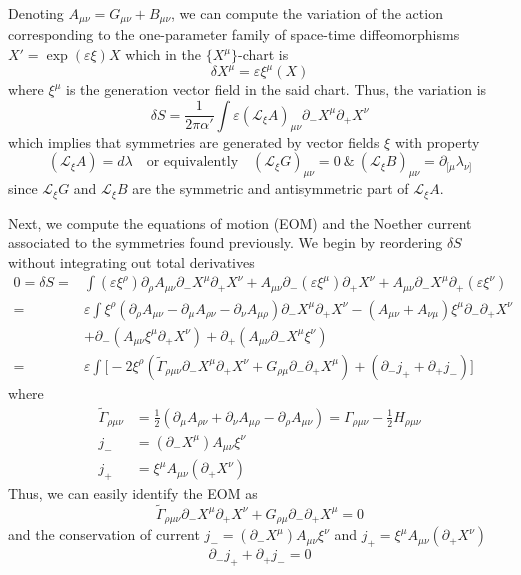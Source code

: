 \documentclass[a4paper,12pt]{article}
\numberwithin{equation}{section}
\numberwithin{thm}{section}
\numberwithin{exm}{section}
\newcommand{\p}{\partial}
\newcommand{\ddm}{\partial_-}
\newcommand{\ddp}{\partial_+}
\newcommand{\lag}{\mathcal L}
\newcommand{\wt}{\widetilde}
\newcommand{\<}{{\langle}}
\renewcommand{\>}{{\rangle}}
\newcommand{\ve}{{\varepsilon}}
\begin{document}
Denoting $A_{\mu\nu}=G_{\mu\nu}+B_{\mu\nu}$, we can compute the variation of the action corresponding to the one-parameter family of space-time diffeomorphisms $X'=\exp(\varepsilon\xi)X$ which in the $\{X^{\mu}\}$-chart is
	\begin{equation}
	\delta X^\mu=\varepsilon\xi^\mu(X)
	\end{equation}
where $\xi^\mu$ is the generation vector field in the said chart. Thus, the variation is
	\begin{equation}
	\delta S=\frac{1}{2\pi\alpha'}\int \varepsilon(\lag_\xi A)_{\mu\nu}\p_-X^\mu\p_+X^\nu
	\end{equation}
which implies that symmetries are generated by vector fields $\xi$ with property
	\begin{equation}
	(\lag_\xi A)=d\lambda\quad\text{or equivalently}\quad(\lag_\xi G)_{\mu\nu}=0\ \&\ (\lag_\xi B)_{\mu\nu}=\p_{[\mu}\lambda_{\nu]}
	\end{equation}
since $\lag_\xi G$ and $\lag_\xi B$ are the symmetric and antisymmetric part of $\lag_\xi A$.

Next, we compute the equations of motion (EOM) and the Noether current associated to the symmetries found previously. We begin by reordering $\delta S$ without integrating out total derivatives
	\begin{align}
	0=\delta S=&\int(\ve\xi^\rho)\p_\rho A_{\mu\nu}\p_-X^\mu\p_+X^\nu + A_{\mu\nu}\p_-(\ve\xi^\mu)\p_+ X^\nu + A_{\mu\nu}\p_-X^\mu\p_+(\ve\xi^\nu) \nonumber \\
	=& \ve\int\xi^\rho(\p_\rho A_{\mu\nu}-\p_\mu A_{\rho\nu}-\p_\nu A_{\mu\rho})\p_-X^\mu\p_+ X^\nu - (A_{\mu\nu}+A_{\nu\mu})\xi^\mu\p_-\p_+ X^\nu \nonumber \\
	&+\p_-(A_{\mu\nu}\xi^\mu\p_+X^\nu)+\p_+(A_{\mu\nu}\p_-X^\mu\xi^\nu) \nonumber \\
	=&\ve\int\Big[-2\xi^\rho(\wt\Gamma_{\rho\mu\nu}\ddm X^\mu\ddp X^\nu+G_{\rho\mu}\ddm\ddp X^\mu)+(\ddm j_+ +\ddp j_-)\Big]
	\end{align}
where 
	\begin{align}
	\wt\Gamma_{\rho\mu\nu}&=\frac{1}{2}(\p_\mu A_{\rho\nu}+\p_\nu A_{\mu\rho}-\p_\rho A_{\mu\nu})=\Gamma_{\rho\mu\nu}-\frac12 H_{\rho\mu\nu}\\
	j_-&=(\p_- X^\mu) A_{\mu\nu}\xi^\nu\\
	j_+&=\xi^\mu A_{\mu\nu}(\p_+X^\nu)
	\end{align}
Thus, we can easily identify the EOM as
	\begin{equation}
	\wt\Gamma_{\rho\mu\nu}\ddm X^\mu\ddp X^\nu+G_{\rho\mu}\ddm\ddp X^\mu=0
	\end{equation}
and the conservation of current $j_-=(\p_-X^\mu) A_{\mu\nu}\xi^\nu$ and $j_+=\xi^\mu A_{\mu\nu}(\p_+X^\nu)$
	\begin{equation}
	\p_-j_+ + \p_+j_-=0
	\end{equation}
\end{document}
